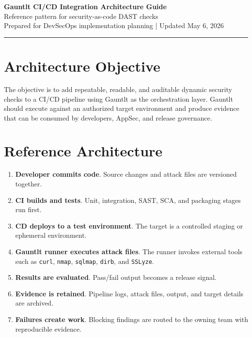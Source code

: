 \documentclass[11pt]{article}
\newcommand{\TitleBlock}[2]{%
  \begin{center}
  {\LARGE\bfseries\color{HeaderBlue} #1}\\[0.35em]
  {\large #2}\\[0.4em]
  {\small Prepared for DevSecOps implementation planning | Updated May 6, 2026}
  \end{center}
  \vspace{0.4em}\hrule\vspace{0.8em}
}
\begin{document}
\TitleBlock{Gauntlt CI/CD Integration Architecture Guide}{Reference pattern for security-as-code DAST checks}

\section{Architecture Objective}
The objective is to add repeatable, readable, and auditable dynamic security checks to a CI/CD pipeline using Gauntlt as the orchestration layer. Gauntlt should execute against an authorized target environment and produce evidence that can be consumed by developers, AppSec, and release governance.

\section{Reference Architecture}
\begin{enumerate}
  \item \textbf{Developer commits code}. Source changes and attack files are versioned together.
  \item \textbf{CI builds and tests}. Unit, integration, SAST, SCA, and packaging stages run first.
  \item \textbf{CD deploys to a test environment}. The target is a controlled staging or ephemeral environment.
  \item \textbf{Gauntlt runner executes attack files}. The runner invokes external tools such as \texttt{curl}, \texttt{nmap}, \texttt{sqlmap}, \texttt{dirb}, and \texttt{SSLyze}.
  \item \textbf{Results are evaluated}. Pass/fail output becomes a release signal.
  \item \textbf{Evidence is retained}. Pipeline logs, attack files, output, and target details are archived.
  \item \textbf{Failures create work}. Blocking findings are routed to the owning team with reproducible evidence.
\end{enumerate}
\end{document}
